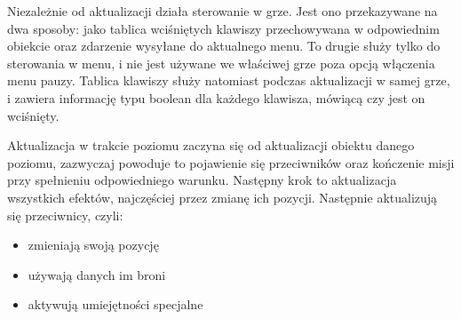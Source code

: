 Niezależnie od aktualizacji działa sterowanie w grze. Jest ono przekazywane na dwa sposoby: jako tablica wci\'sniętych klawiszy przechowywana w odpowiednim obiekcie oraz zdarzenie wysyłane do aktualnego menu. To drugie służy tylko do sterowania w menu, i nie jest używane we wła\'sciwej grze poza opcją włączenia menu pauzy. Tablica klawiszy służy natomiast podczas aktualizacji w samej grze, i zawiera informację typu boolean dla każdego klawisza, mówiącą czy jest on wci\'snięty.


Aktualizacja w trakcie poziomu zaczyna się od aktualizacji obiektu danego poziomu, zazwyczaj powoduje to pojawienie się przeciwników oraz kończenie misji przy spełnieniu odpowiedniego warunku. Następny krok to aktualizacja wszystkich efektów, najczę\'sciej przez zmianę ich pozycji.
Następnie aktualizują się przeciwnicy, czyli:\begin{itemize}
	\item zmieniają swoją pozycję
	\item używają danych im broni
	\item aktywują umiejętno\'sci specjalne
\end{itemize}

\cleardoublepage
